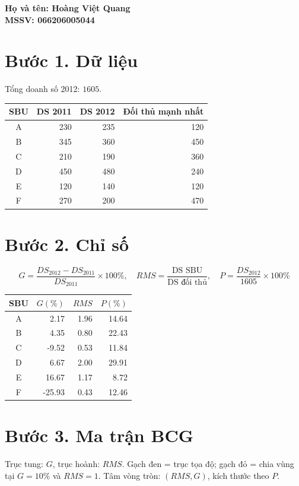 \documentclass[a4paper]{article}
\begin{document}
\textbf{Họ và tên: Hoàng Việt Quang}\\
\textbf{MSSV: 066206005044}

\vspace{0.2cm}

\section*{Bước 1. Dữ liệu}
Tổng doanh số 2012: $1605$.

\begin{center}
\begin{tabular}{c r r r}
\toprule
SBU & DS 2011 & DS 2012 & Đối thủ mạnh nhất \\
\midrule
A & 230 & 235 & 120 \\
B & 345 & 360 & 450 \\
C & 210 & 190 & 360 \\
D & 450 & 480 & 240 \\
E & 120 & 140 & 120 \\
F & 270 & 200 & 470 \\
\bottomrule
\end{tabular}
\end{center}

\section*{Bước 2. Chỉ số}
\[
G=\frac{DS_{2012}-DS_{2011}}{DS_{2011}}\times 100\%,\quad
RMS=\frac{\text{DS SBU}}{\text{DS đối thủ}},\quad
P=\frac{DS_{2012}}{1605}\times 100\%
\]

\begin{center}
\begin{tabular}{c r r r}
\toprule
SBU & $G(\%)$ & $RMS$ & $P(\%)$ \\
\midrule
A & 2.17 & 1.96 & 14.64 \\
B & 4.35 & 0.80 & 22.43 \\
C & -9.52 & 0.53 & 11.84 \\
D & 6.67 & 2.00 & 29.91 \\
E & 16.67 & 1.17 & 8.72 \\
F & -25.93 & 0.43 & 12.46 \\
\bottomrule
\end{tabular}
\end{center}

\section*{Bước 3. Ma trận BCG}
Trục tung: $G$, trục hoành: $RMS$.
Gạch đen = trục tọa độ; gạch đỏ = chia vùng tại $G=10\%$ và $RMS=1$.
Tâm vòng tròn: $(RMS,G)$, kích thước theo $P$.
\end{document}

